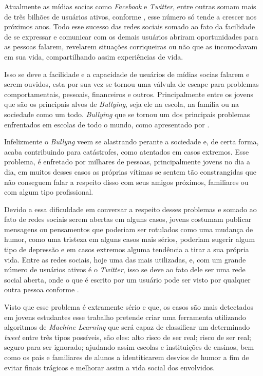 Atualmente as mídias socias como \textit{Facebook} e \textit{Twitter}, entre outras somam mais de três bilhões de usuários ativos, conforme , esse número só tende a crescer nos próximos anos. Todo esse sucesso das redes sociais somado ao fato da facilidade de se expressar e comunicar com os demais usuários abriram oportunidades para as pessoas falarem, revelarem situações corriqueiras ou não que as incomodavam em sua vida, compartilhando assim experiências de vida. 

Isso se deve a facilidade e a capacidade de usuários de mídias socias falarem e serem ouvidos, esta por sua vez se tornou uma válvula de escape para problemas comportamentais, pessoais, financeiros e outros. Principalmente entre os jovens que são os principais alvos de \textit{Bullying}, seja ele na escola, na família ou na sociedade como um todo. \textit{Bullying} que se tornou um dos principais problemas enfrentados em escolas de todo o mundo, como apresentado por . 

Infelizmente  o \textit{Bullyng} veem se alastrando perante a sociedade e, de certa forma, acaba contribuindo para catástrofes, como atentados em casos extremos. Esse problema, é enfretado por milhares de pessoas, principalmente jovens no dia a dia, em muitos desses casos as próprias vítimas se sentem tão constrangidas que não conseguem falar a respeito disso com seus amigos próximos, familiares ou com algum tipo profissional.

Devido a essa dificuldade em conversar a respeito desses problemas e somado ao fato de redes sociais serem abertas em alguns casos, jovens costumam publicar mensagens ou pensamentos que poderiam ser rotulados como uma mudança de humor, como uma tristeza em alguns casos mais sérios, poderiam sugerir algum tipo de depressão e em casos extremos alguma tendência a
tirar a sua própria vida. Entre as redes sociais, hoje uma das mais utilizadas, e, com um grande número de usuários ativos é o \textit{Twitter}, isso se deve ao fato dele ser uma rede social aberta, onde o que é escrito por um usuário pode ser visto por qualquer outra pessoa conforme .

Visto que esse problema é extramente sério e que, os casos são mais detectados em jovens estudantes esse trabalho pretende criar uma ferramenta utilizando algoritmos de \textit{Machine Learning} que será capaz de classificar um determinado \textit{tweet} entre três tipos possíveis, são eles: alto risco de ser real; risco de ser real; seguro para ser ignorado; ajudando assim escolas e instituições de ensinos, bem como os pais e familiares de alunos a identiticarem desvios de humor a fim de evitar finais trágicos e melhorar assim a vida social dos envolvidos.

